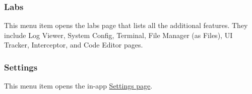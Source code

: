 \subsubsection{Labs}\label{subsubsec:main:labs} %
This menu item opens the labs page that lists all the additional features. They include Log Viewer,
System Config, Terminal, File Manager (as Files), UI Tracker, Interceptor, and Code Editor pages.

\subsubsection{Settings} %
This menu item opens the in-app \hyperref[sec:settings-page]{Settings page}.
